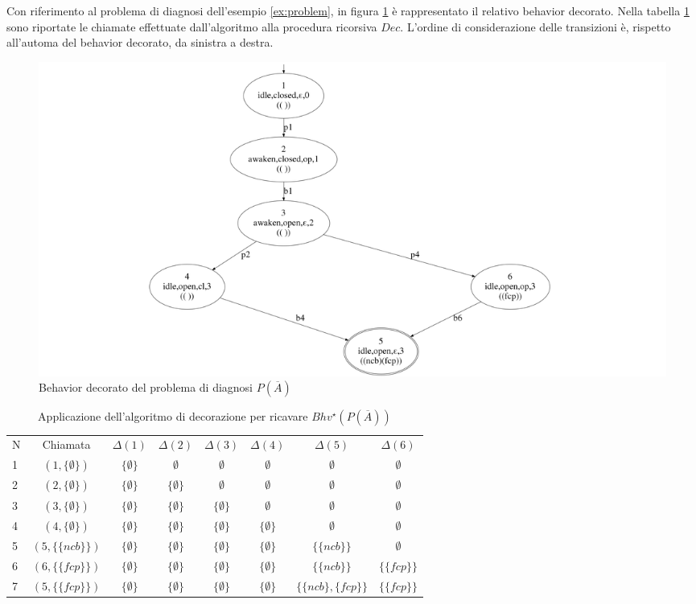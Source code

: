 \begin{ex}
Con riferimento al problema di diagnosi dell'esempio \ref{ex:problem}, in figura \ref{fig:bhv_star} è rappresentato il relativo behavior decorato.
Nella tabella \ref{tab:decoration} sono riportate le chiamate effettuate dall'algoritmo alla procedura ricorsiva $Dec$. L'ordine di considerazione delle transizioni è, rispetto all'automa del behavior decorato, da sinistra a destra.
\end{ex}

\begin{figure}[htbp]
\centering
\includegraphics[scale=0.13]{./Img/sa/bhv_star.png}
\caption{Behavior decorato del problema di diagnosi $P(\overline{A})$}
\label{fig:bhv_star}
\end{figure}

\begin{table}[htbp] 
\begin{tabularx}{\textwidth}{l c c c c c c c}
\hline
N & Chiamata & $\Delta(1)$ & $\Delta(2)$ & $\Delta(3)$ & $\Delta(4)$ & $\Delta(5)$ & $\Delta(6)$\\
1 & $(1,\{\emptyset\})$ & $\{\emptyset\}$  & $\emptyset$ & $\emptyset$ & $\emptyset$ & $\emptyset$ & $\emptyset$\\
2 & $(2,\{\emptyset\})$ & $\{\emptyset\}$  & $\{\emptyset\}$ & $\emptyset$ & $\emptyset$ & $\emptyset$ & $\emptyset$\\
3 & $(3,\{\emptyset\})$ & $\{\emptyset\}$  & $\{\emptyset\}$ & $\{\emptyset\}$ & $\emptyset$ & $\emptyset$ & $\emptyset$\\
4 & $(4,\{\emptyset\})$ & $\{\emptyset\}$  & $\{\emptyset\}$ & $\{\emptyset\}$ & $\{\emptyset\}$ & $\emptyset$ & $\emptyset$\\
5 & $(5,\{\{ncb\}\})$ & $\{\emptyset\}$  & $\{\emptyset\}$ & $\{\emptyset\}$ & $\{\emptyset\}$ & $\{\{ncb\}\}$ & $\emptyset$\\
6 & $(6,\{\{fcp\}\})$ & $\{\emptyset\}$  & $\{\emptyset\}$ & $\{\emptyset\}$ & $\{\emptyset\}$ & $\{\{ncb\}\}$ & $\{\{fcp\}\}$\\
7 & $(5,\{\{fcp\}\})$ & $\{\emptyset\}$  & $\{\emptyset\}$ & $\{\emptyset\}$ & $\{\emptyset\}$ & $\{\{ncb\},\{fcp\}\}$ & $\{\{fcp\}\}$\\
\hline
\end{tabularx}
\caption{Applicazione dell'algoritmo di decorazione per ricavare $Bhv^\star(P(\overline{A}))$}
\label{tab:decoration}
\end{table}

